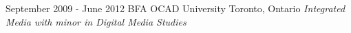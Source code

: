 \documentclass[10pt,a4paper,sans]{moderncv}   %
\begin{document}
\cventry
  {September 2009 - June 2012}
  {BFA}
  {OCAD University}
  {Toronto, Ontario}
  {\textit{Integrated Media with minor in Digital Media Studies}}
  {}
\end{document}
